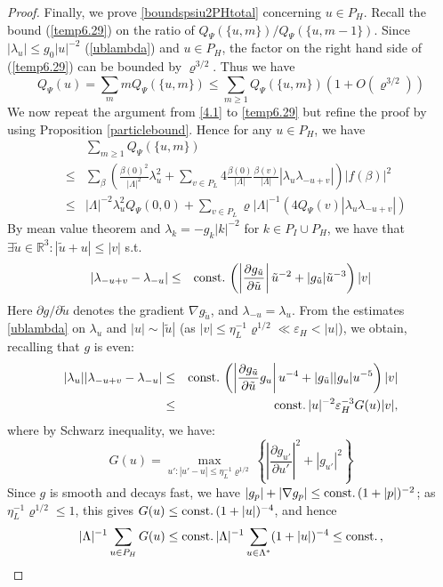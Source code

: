 \documentclass[11pt]{article}
\numberwithin{equation}{section}
\newcommand{\beq}{\begin{equation}}
\newcommand{\eeq}{\end{equation}}
\newcommand{\beqa}{\begin{eqnarray}}
\newcommand{\eeqa}{\end{eqnarray}}
\newcommand\R{{\mathbb R}}
\newcommand\eps{\varepsilon}
\newcommand\const{{\rm const.\, }}
\newcommand\be{\beta}
\renewcommand\rho\varrho
\theoremstyle{definition}
\begin{document}
\begin{proof}
Finally, we  prove  \eqref{boundspsiu2PHtotal} concerning $ u\in P_H$.
Recall the bound  (\ref{temp6.29}) on the ratio of $ Q_\Psi(\{u,m\})/ Q_\Psi(\{u,m-1\})$. Since  
$|\lambda_u|\leq g_0 |u|^{-2}$ (\ref{ublambda}) and $u \in P_{H}$, the factor on the right hand side  of
(\ref{temp6.29}) can be bounded by $\rho^{3/2}$.
Thus we have 
\beq\label{temp7.16}
 Q_\Psi(u)=\sum_{m}m  Q_\Psi(\{u,m\})\leq
\sum_{m\geq 1}  Q_\Psi(\{u,m\})(1+O(\rho^{3/2}))
\eeq
We now repeat the argument from \eqref{4.1} to \eqref{temp6.29} but refine the proof by using Proposition 
\ref{particlebound}. 
Hence for any $u\in P_H$, we have %
\beqa\nonumber
&&\sum_{m\geq 1}  Q_\Psi(\{u,m\})\\\nonumber
&\leq&\sum_{\be} \left(\frac{\be(0)^2}{|\Lambda|^2}\lambda_u^2+\sum_{v\in P_L}4\frac{\be(0)}{|\Lambda|}\frac{\be(v)}{|\Lambda|}\left|\lambda_{u}\lambda_{-u+v}\right|\right)|f(\be)|^2\\\label{proofubpsiu12}
&\leq& |\Lambda|^{-2}\lambda_u^2Q_\Psi(0,0)+\sum_{v\in P_L}\rho |\Lambda|^{-1}\left(4Q_\Psi(v)\left|\lambda_{u}\lambda_{-u+v}\right|\right)
\eeqa
By mean value theorem and $\lambda_k=-g_k|k|^{-2}$ for $k\in P_I\cup P_H$, we have that  $\exists\tilde u\in \R^3: |\tilde u+u|\leq |v|$ s.t.
\beqa
|\lambda_{-u+v}-\lambda_{-u}|&\leq &\const \left(\left|\frac{\partial g_{\tilde u}}{\partial {\tilde u}}\right|{\tilde u}^{-2}+|g_{\tilde u}|{\tilde u}^{-3}\right)|v|
\eeqa
Here $\partial g/\partial\tilde u$ denotes the gradient $\nabla g_{\tilde u}$, and $\lambda_{-u}=\lambda_u$.
{F}rom  the estimates \eqref{ublambda} on $\lambda_u$ and $|u|\sim |\tilde u|$ (as $|v|\leq\eta_L^{-1}\rho^{1/2}\ll\eps_H<|u|$), we obtain, recalling that $g$ is even:
\beqa
|\lambda_u||\lambda_{-u+v}-\lambda_{-u}|&\leq &\const \left(\left|\frac{\partial g_{\tilde u}}{\partial {\tilde u}}g_u\right|u^{-4}+|g_{\tilde u}||g_u|u^{-5}\right)|v|\nonumber\\
&\leq &\const |u|^{-2}\eps_H^{-3}G(u)|v|,
\eeqa 
where by Schwarz inequality, we have:
\beq
G(u)=\max_{u':|u'-u|\leq\eta_L^{-1}\rho^{1/2}}\left\{\left|\frac{\partial g_{ u'}}{\partial {u'}}\right|^2+|g_{u'}|^2\right\}
\eeq
Since $g$ is smooth and decays fast, we have $|g_p|+|\nabla g_p|\leq \const(1+|p|)^{-2}$; as $\eta_L^{-1}\rho^{1/2}\leq1$, this gives $G(u)\leq\const(1+|u|)^{-4}$, and hence
\[
|\Lambda|^{-1}\sum_{u\in P_H}G(u)\leq\const|\Lambda|^{-1}\sum_{u\in\Lambda^*}(1+|u|)^{-4}\leq\const,
\]
\end{proof}
\end{document}
